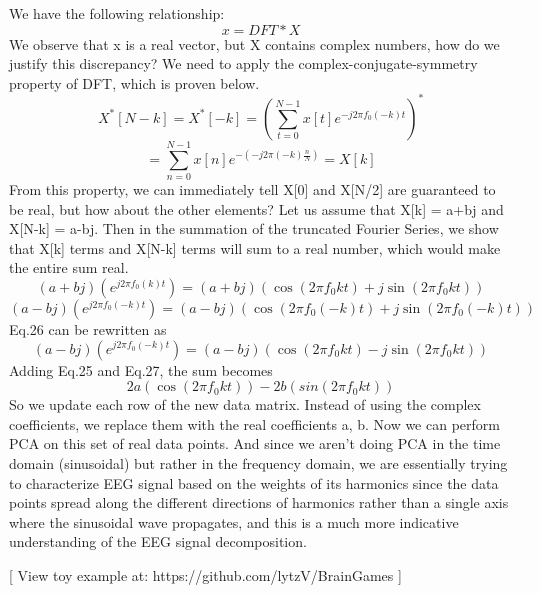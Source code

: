\documentclass{article}
\begin{document}
We have the following relationship:
\begin{equation}
   	x = DFT * X
   \end{equation} 
We observe that x is a real vector, but X contains complex numbers, how do we justify this discrepancy? We need to apply the complex-conjugate-symmetry property of DFT, which is proven below.
\begin{equation}
X^{*}[N-k]=X^{*}[-k]=\left(\sum_{t=0}^{N-1} x[t] e^{-j 2 \pi f_{0}(-k) t}\right)^{*}
\end{equation}
\begin{equation}
=\sum_{n=0}^{N-1} x[n] e^{-\left(-j 2 \pi(-k) \frac{n}{N}\right)} = X[k]
\end{equation}
From this property, we can immediately tell X[0] and X[N/2] are guaranteed to be real, but how about the other elements? Let us assume that X[k] = a+bj and X[N-k] = a-bj.
Then in the summation of the truncated Fourier Series, we show that X[k] terms and X[N-k] terms will sum to a real number, which would make the entire sum real.
\begin{equation}
(a+bj)\left(e^{j 2 \pi f_{0}(k) t}\right) = (a+b j)\left(\cos (2 \pi f_{0} k t)+j \sin \left(2 \pi f_{0} k t\right)\right)
\end{equation}
\begin{equation}
(a-bj)\left(e^{j 2 \pi f_{0}(-k) t}\right) = (a-b j)\left(\cos (2 \pi f_{0} (-k) t)+j \sin \left(2 \pi f_{0} (-k )t\right)\right)
\end{equation}
Eq.26 can be rewritten as 
\begin{equation}
(a-bj)\left(e^{j 2 \pi f_{0}(-k) t}\right) = (a-b j)\left(\cos (2 \pi f_{0} k t)-j \sin \left(2 \pi f_{0} kt\right)\right)
\end{equation}
Adding Eq.25 and Eq.27, the sum becomes
\begin{equation}
2a\left(\cos (2 \pi f_{0} k t)\right) - 2b\left(sin (2 \pi f_{0} kt)\right)
\end{equation}
So we update each row of the new data matrix. Instead of using the complex coefficients, we replace them with the real coefficients a, b. Now we can perform PCA on this set of real data points. And since we aren't doing PCA in the time domain (sinusoidal) but rather in the frequency domain, we are essentially trying to characterize EEG signal based on the weights of its harmonics since the data points spread along the different directions of harmonics rather than a single axis where the sinusoidal wave propagates, and this is a much more indicative understanding of the EEG signal decomposition.

[ View toy example at: https://github.com/lytzV/BrainGames ]
\end{document}
